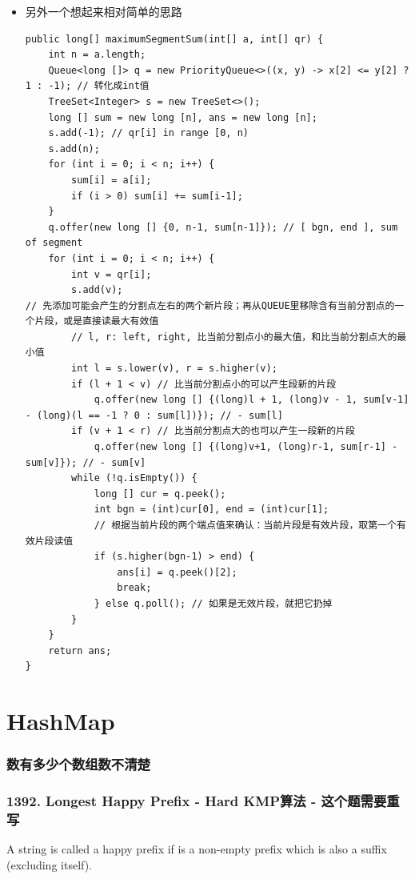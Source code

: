 \documentclass[9pt, b5paaper]{book}
\begin{document}
\begin{itemize}
\item 另外一个想起来相对简单的思路
\begin{verbatim}
public long[] maximumSegmentSum(int[] a, int[] qr) {
    int n = a.length;
    Queue<long []> q = new PriorityQueue<>((x, y) -> x[2] <= y[2] ? 1 : -1); // 转化成int值
    TreeSet<Integer> s = new TreeSet<>();
    long [] sum = new long [n], ans = new long [n];
    s.add(-1); // qr[i] in range [0, n)
    s.add(n);
    for (int i = 0; i < n; i++) {
        sum[i] = a[i];
        if (i > 0) sum[i] += sum[i-1];
    }
    q.offer(new long [] {0, n-1, sum[n-1]}); // [ bgn, end ], sum of segment
    for (int i = 0; i < n; i++) {
        int v = qr[i];
        s.add(v);
// 先添加可能会产生的分割点左右的两个新片段；再从QUEUE里移除含有当前分割点的一个片段，或是直接读最大有效值                
        // l, r: left, right, 比当前分割点小的最大值，和比当前分割点大的最小值
        int l = s.lower(v), r = s.higher(v); 
        if (l + 1 < v) // 比当前分割点小的可以产生段新的片段
            q.offer(new long [] {(long)l + 1, (long)v - 1, sum[v-1] - (long)(l == -1 ? 0 : sum[l])}); // - sum[l]
        if (v + 1 < r) // 比当前分割点大的也可以产生一段新的片段
            q.offer(new long [] {(long)v+1, (long)r-1, sum[r-1] - sum[v]}); // - sum[v]
        while (!q.isEmpty()) {
            long [] cur = q.peek();
            int bgn = (int)cur[0], end = (int)cur[1];
            // 根据当前片段的两个端点值来确认：当前片段是有效片段，取第一个有效片段读值
            if (s.higher(bgn-1) > end) {
                ans[i] = q.peek()[2];
                break;
            } else q.poll(); // 如果是无效片段，就把它扔掉
        }
    }
    return ans;
}
\end{verbatim}
\end{itemize}
\chapter{HashMap}
\label{sec-7}
\subsection{数有多少个数组数不清楚}
\label{sec-7-0-1}
\subsection{1392. Longest Happy Prefix - Hard KMP算法 - 这个题需要重写}
\label{sec-7-0-2}
A string is called a happy prefix if is a non-empty prefix which is also a suffix (excluding itself).
\end{document}
